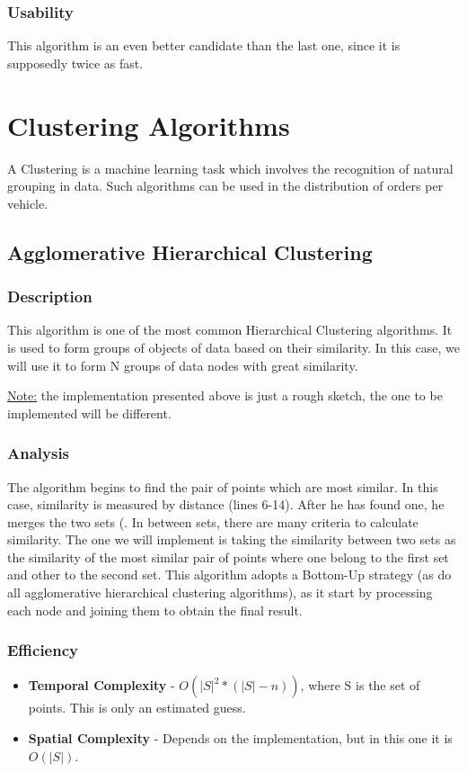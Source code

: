 \subsubsection{Usability}
This algorithm is an even better candidate than the last one, since it is supposedly twice as fast. 


\newpage
\section{Clustering Algorithms}

A Clustering is a machine learning task which involves the recognition of natural grouping in data. Such algorithms can be used in the distribution of orders per vehicle.


\subsection{Agglomerative Hierarchical Clustering}

\subsubsection{Description}

This algorithm is one of the most common Hierarchical Clustering algorithms. It is used to form groups of objects of data based on their similarity. In this case, we will use it to form N groups of data nodes with great similarity.


\uline{Note:} the implementation presented above is just a rough sketch, the one to be implemented will be different.

\subsubsection{Analysis}
The algorithm begins to find the pair of points which are most similar. In this case, similarity is measured by distance (lines 6-14). After he has found one, he merges the two sets (. In between sets, there are many criteria to calculate similarity. The one we will implement is taking the similarity between two sets as the similarity of the most similar pair of points where one belong to the first set and other to the second set. This algorithm adopts a Bottom-Up strategy (as do all agglomerative hierarchical clustering algorithms), as it start by processing each node and joining them to obtain the final result.  

\subsubsection{Efficiency}
\begin{itemize}
    \item \textbf{Temporal Complexity} - $ O(|S|^2*(|S| - n)) $, where S is the set of points. This is only an estimated guess.
    \item \textbf{Spatial Complexity} - Depends on the implementation, but in this one it is $ O(|S|) $.
\end{itemize}

